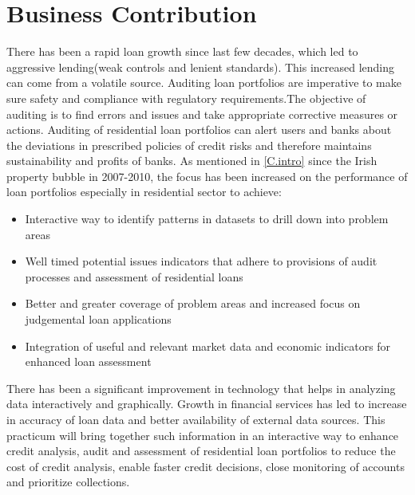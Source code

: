 \section{Business Contribution}
There has been a rapid loan growth since last few decades, which led to aggressive lending(weak controls and lenient standards). This increased lending can come from a volatile source. Auditing loan portfolios are imperative to make sure safety and compliance with regulatory requirements.The objective of auditing is to find errors and issues and take appropriate corrective measures or actions. Auditing of residential loan portfolios can alert users and banks about the deviations in prescribed policies of credit risks and therefore maintains sustainability and profits of banks. As mentioned in \ref{C.intro} since the Irish property bubble in 2007-2010, the focus has been increased on the performance of loan portfolios especially in residential sector to achieve:
\begin{itemize}
\item Interactive way to identify patterns in datasets to drill down into problem areas
\item Well timed potential issues indicators that adhere to provisions of audit processes and assessment of residential loans
\item Better and greater coverage of problem areas and increased focus on judgemental loan applications
\item Integration of useful and relevant market data and economic indicators for enhanced loan assessment
\end{itemize}

There has been a significant improvement in technology that helps in analyzing data interactively and graphically. Growth in financial services has led to increase in accuracy of loan data and better availability of external data sources. This practicum will bring together such information in an interactive way to enhance credit analysis, audit and assessment of residential loan portfolios to reduce the cost of credit analysis, enable faster credit decisions, close monitoring of accounts and prioritize collections.
 
